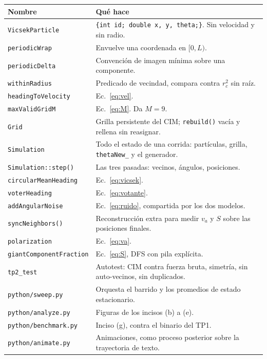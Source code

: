 \documentclass[11pt]{article}
\begin{document}
\begin{center}
\begin{tabular}{p{5.0cm}p{8.8cm}}
  \toprule
  Nombre & Qué hace \\
  \midrule
  \texttt{VicsekParticle} & \texttt{\{int id; double x, y, theta;\}}. Sin velocidad y sin radio. \\
  \texttt{periodicWrap} & Envuelve una coordenada en $[0, L)$. \\
  \texttt{periodicDelta} & Convención de imagen mínima sobre una componente. \\
  \texttt{withinRadius} & Predicado de vecindad, compara contra $r_c^2$ sin raíz. \\
  \texttt{headingToVelocity} & Ec.~\eqref{eq:vel}. \\
  \texttt{maxValidGridM} & Ec.~\eqref{eq:M}. Da $M = 9$. \\
  \texttt{Grid} & Grilla persistente del CIM; \texttt{rebuild()} vacía y rellena sin reasignar. \\
  \texttt{Simulation} & Todo el estado de una corrida: partículas, grilla, \texttt{thetaNew\_} y el generador. \\
  \texttt{Simulation::step()} & Las tres pasadas: vecinos, ángulos, posiciones. \\
  \texttt{circularMeanHeading} & Ec.~\eqref{eq:vicsek}. \\
  \texttt{voterHeading} & Ec.~\eqref{eq:votante}. \\
  \texttt{addAngularNoise} & Ec.~\eqref{eq:ruido}, compartida por los dos modelos. \\
  \texttt{syncNeighbors()} & Reconstrucción extra para medir $v_a$ y $S$ sobre las posiciones finales. \\
  \texttt{polarization} & Ec.~\eqref{eq:va}. \\
  \texttt{giantComponentFraction} & Ec.~\eqref{eq:S}, DFS con pila explícita. \\
  \texttt{tp2\_test} & Autotest: CIM contra fuerza bruta, simetría, sin auto-vecinos, sin duplicados. \\
  \midrule
  \texttt{python/sweep.py} & Orquesta el barrido y los promedios de estado estacionario. \\
  \texttt{python/analyze.py} & Figuras de los incisos (b) a (e). \\
  \texttt{python/benchmark.py} & Inciso (g), contra el binario del TP1. \\
  \texttt{python/animate.py} & Animaciones, como proceso posterior sobre la trayectoria de texto. \\
  \bottomrule
\end{tabular}
\end{center}
\end{document}
